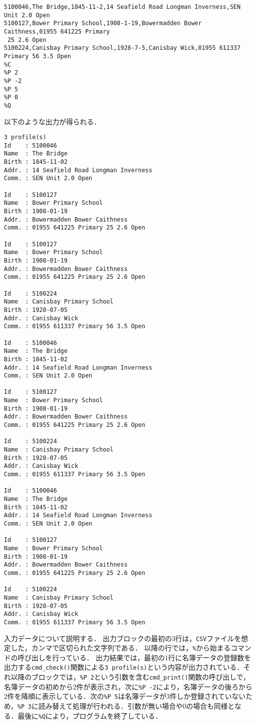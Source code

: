{\fontsize{10pt}{11pt} \selectfont
 \begin{verbatim}
5100046,The Bridge,1845-11-2,14 Seafield Road Longman Inverness,SEN Unit 2.0 Open
5100127,Bower Primary School,1908-1-19,Bowermadden Bower Caithness,01955 641225 Primary
 25 2.6 Open
5100224,Canisbay Primary School,1928-7-5,Canisbay Wick,01955 611337 Primary 56 3.5 Open
%C
%P 2
%P -2
%P 5
%P 0
%Q
 \end{verbatim}
}

\noindent %
以下のような出力が得られる．

{\fontsize{10pt}{11pt} \selectfont
 \begin{verbatim}
3 profile(s)
Id    : 5100046
Name  : The Bridge
Birth : 1845-11-02
Addr. : 14 Seafield Road Longman Inverness
Comm. : SEN Unit 2.0 Open

Id    : 5100127
Name  : Bower Primary School
Birth : 1908-01-19
Addr. : Bowermadden Bower Caithness
Comm. : 01955 641225 Primary 25 2.6 Open

Id    : 5100127
Name  : Bower Primary School
Birth : 1908-01-19
Addr. : Bowermadden Bower Caithness
Comm. : 01955 641225 Primary 25 2.6 Open

Id    : 5100224
Name  : Canisbay Primary School
Birth : 1928-07-05
Addr. : Canisbay Wick
Comm. : 01955 611337 Primary 56 3.5 Open

Id    : 5100046
Name  : The Bridge
Birth : 1845-11-02
Addr. : 14 Seafield Road Longman Inverness
Comm. : SEN Unit 2.0 Open

Id    : 5100127
Name  : Bower Primary School
Birth : 1908-01-19
Addr. : Bowermadden Bower Caithness
Comm. : 01955 641225 Primary 25 2.6 Open

Id    : 5100224
Name  : Canisbay Primary School
Birth : 1928-07-05
Addr. : Canisbay Wick
Comm. : 01955 611337 Primary 56 3.5 Open

Id    : 5100046
Name  : The Bridge
Birth : 1845-11-02
Addr. : 14 Seafield Road Longman Inverness
Comm. : SEN Unit 2.0 Open

Id    : 5100127
Name  : Bower Primary School
Birth : 1908-01-19
Addr. : Bowermadden Bower Caithness
Comm. : 01955 641225 Primary 25 2.6 Open

Id    : 5100224
Name  : Canisbay Primary School
Birth : 1928-07-05
Addr. : Canisbay Wick
Comm. : 01955 611337 Primary 56 3.5 Open

 \end{verbatim}
}

入力データについて説明する．
出力ブロックの最初の3行は，\verb|CSV|ファイルを想定した，カンマで区切られた文字列である．
以降の行では，\verb|%|から始まるコマンドの呼び出しを行っている．
出力結果では，最初の1行に名簿データの登録数を出力する\verb|cmd_check()|関数による\verb|3 profile(s)|という内容が出力されている．それ以降のブロックでは，\verb|%P 2|という引数を含む\verb|cmd_print()|関数の呼び出しで，名簿データの初めから2件が表示され，次に\verb|%P -2|により，名簿データの後ろから2件を降順に表示している．次の\verb|%P 5|は名簿データが3件しか登録されていないため，\verb|%P 3|に読み替えて処理が行われる．引数が無い場合や$0$の場合も同様となる．最後に\verb|%Q|により，プログラムを終了している．


